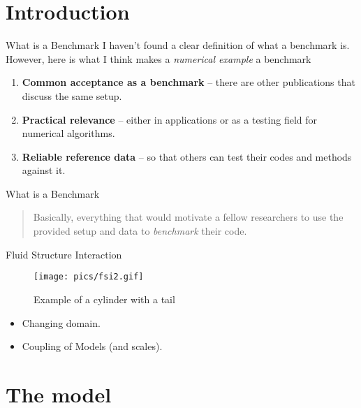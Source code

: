 \hypertarget{introduction}{%
\section{Introduction}\label{introduction}}

\begin{frame}{What is a Benchmark}
\protect\hypertarget{what-is-a-benchmark}{}
I haven't found a clear definition of what a benchmark is. However, here
is what I think makes a \emph{numerical example} a benchmark

\begin{enumerate}
\tightlist
\item
  \textbf{Common acceptance as a benchmark} -- there are other
  publications that discuss the same setup.
\item
  \textbf{Practical relevance} -- either in applications or as a testing
  field for numerical algorithms.
\item
  \textbf{Reliable reference data} -- so that others can test their
  codes and methods against it.
\end{enumerate}
\end{frame}

\begin{frame}{What is a Benchmark}
\protect\hypertarget{what-is-a-benchmark-1}{}
\begin{quote}
Basically, everything that would motivate a fellow researchers to use
the provided setup and data to \emph{benchmark} their code.
\end{quote}
\end{frame}

\begin{frame}{Fluid Structure Interaction}
\protect\hypertarget{fluid-structure-interaction}{}
\begin{figure}
\centering
\texttt{[image: pics/fsi2.gif]}
\caption{Example of a cylinder with a tail}
\end{figure}

\begin{itemize}
\tightlist
\item
  Changing domain.
\item
  Coupling of Models (and scales).
\end{itemize}
\end{frame}

\hypertarget{the-model}{%
\section{The model}\label{the-model}}

